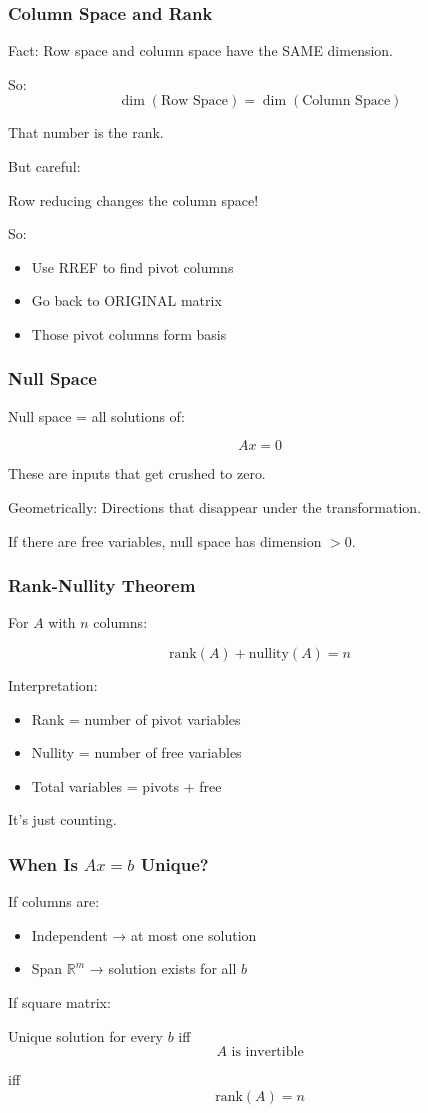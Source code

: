 \documentclass{beamer}
\begin{document}
\begin{frame}
\frametitle{Column Space and Rank}

Fact:
Row space and column space have the SAME dimension.

So:
\[
\dim(\text{Row Space}) = \dim(\text{Column Space})
\]

That number is the rank.

But careful:

Row reducing changes the column space!

So:
\begin{itemize}
    \item Use RREF to find pivot columns
    \item Go back to ORIGINAL matrix
    \item Those pivot columns form basis
\end{itemize}
\end{frame}

\begin{frame}
\frametitle{Null Space}

Null space = all solutions of:

\[
Ax = 0
\]

These are inputs that get crushed to zero.

Geometrically:
Directions that disappear under the transformation.

If there are free variables,
null space has dimension $> 0$.
\end{frame}

\begin{frame}
\frametitle{Rank-Nullity Theorem}

For $A$ with $n$ columns:

\[
\text{rank}(A) + \text{nullity}(A) = n
\]

Interpretation:

\begin{itemize}
    \item Rank = number of pivot variables
    \item Nullity = number of free variables
    \item Total variables = pivots + free
\end{itemize}

It’s just counting.
\end{frame}

\begin{frame}
\frametitle{When Is $Ax=b$ Unique?}

If columns are:
\begin{itemize}
    \item Independent → at most one solution
    \item Span $\mathbb{R}^m$ → solution exists for all $b$
\end{itemize}

If square matrix:

Unique solution for every $b$
iff
\[
A \text{ is invertible}
\]

iff
\[
\text{rank}(A) = n
\]
\end{frame}
\end{document}
